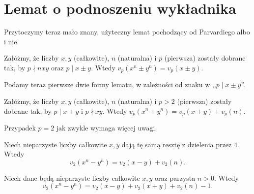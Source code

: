 \section{Lemat o podnoszeniu wykładnika}
Przytoczymy teraz mało znany, użyteczny lemat pochodzący od Parvardiego albo i nie.

\begin{lemat}
	Załóżmy, że liczby $x,y$ (całkowite), $n$ (naturalna) i $p$ (pierwsza) zostały dobrane tak, by $p \nmid nxy$ oraz $p \mid x \pm y$.
	Wtedy $v_p(x^n\pm y^n) = v_p(x \pm y)$.
\end{lemat}

Podamy teraz pierwsze dwie formy lematu, w zależności od znaku w ,,$p \mid x \pm y$''.

\begin{fakt}
	Załóżmy, że liczby $x,y$ (całkowite), $n$ (naturalna) i $p > 2$ (pierwsza) zostały dobrane tak, by $p \mid x \pm y$ i $p \nmid xy$.
	Wtedy $v_p(x^n \pm y^n) = v_p(x \pm y) + v_p(n)$.
\end{fakt}

Przypadek $p=2$ jak zwykle wymaga więcej uwagi.

\begin{fakt}
	Niech nieparzyste liczby całkowite $x,y$ dają tę samą resztę z dzielenia przez $4$.
	Wtedy \[v_2(x^n-y^n) = v_2(x-y) + v_2(n).\]
\end{fakt}

\begin{fakt}
	Niech dane będą nieparzyste liczby całkowite $x,y$ oraz parzysta $n > 0$.
	Wtedy 
	\[
		v_2(x^n-y^n) = v_2(x-y) + v_2(x+y) + v_2(n) - 1.
	\]
\end{fakt}

